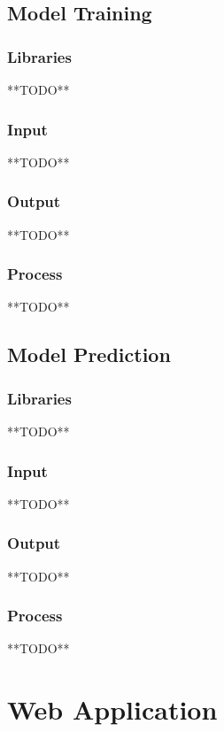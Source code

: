 \documentclass{article}
\begin{document}
\subsection{Model Training}

\subsubsection*{Libraries}
**TODO**

\subsubsection*{Input}
**TODO**

\subsubsection*{Output}
**TODO**

\subsubsection*{Process}
**TODO**

\subsection{Model Prediction}

\subsubsection*{Libraries}
**TODO**

\subsubsection*{Input}
**TODO**

\subsubsection*{Output}
**TODO**

\subsubsection*{Process}
**TODO**

\newpage

\section{Web Application}
\end{document}
